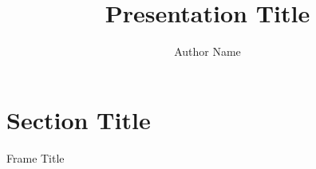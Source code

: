 \documentclass[aspectratio=169,xcolor=dvipsnames]{beamer}
\title{Presentation Title}
\subtitle{}
\author{Author Name}
\institute{}
\date{}
\newcommand{\source}[1]{\par\vfill{\scriptsize\color{gray}#1}}
\newcommand{\bigitems}{\setlength{\itemsep}{0.7em}}
\newcommand{\citesup}[1]{\textsuperscript{#1}}
\begin{document}
\begin{frame}
  \selectfont
  \titlepage
\end{frame}


\section{Section Title}

\begin{frame}{Frame Title}
\end{frame}
\end{document}
